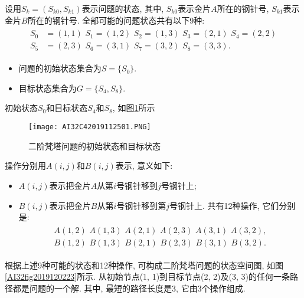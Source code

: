 \begin{result}
设用$S_k=(S_{k0}, S_{k1})$表示问题的状态, 其中, $S_{k0}$表示金片$A$所在的钢针号, $S_{k1}$表示金片$B$所在的钢针号.
全部可能的问题状态共有以下9种:
\begin{align}
\begin{array}{ll}
S_0&=(1, 1)\,\,   S_1=(1, 2)\,\,     S_2=(1, 3)\,\,    S_3=(2, 1)\,\,    S_4=(2, 2)\\
S_5&=(2, 3)\,\,   S_6=(3, 1) \,\,    S_7=(3, 2) \,\,   S_8=(3, 3).
\end{array}
\end{align}

\begin{itemize}
\item 问题的初始状态集合为$S=\{S_0\}$.
\item 目标状态集合为$G=\{S_4, S_8\}$.
\end{itemize}
初始状态$S_0$和目标状态$S_4$和$S_8$, 如图\ref{AI32fig2019120222}所示
\begin{figure}[H]
\centering
\texttt{[image: AI32C42019112501.PNG]}
\caption{二阶梵塔问题的初始状态和目标状态}
\label{AI32fig2019120222}
\end{figure}
操作分别用$A(i, j)$和$B(i, j)$表示, 意义如下:
\begin{itemize}
\item  $A(i, j)$表示把金片$A$从第$i$号钢针移到$j$号钢针上;
\item  $B(i, j)$表示把金片$B$从第$i$号钢针移到第$j$号钢针上. 共有12种操作, 它们分别是:
\begin{align}
\begin{array}{ll}
      A(1, 2)\,\,   A(1, 3) \,\,    A(2, 1)\,\,     A(2, 3) \,\,    A(3, 1) \,\,    A(3, 2),\\
      B(1, 2)\,\,     B(1, 3) \,\,     B(2, 1)\,\,     B(2, 3)  \,\,   B(3, 1)  \,\,    B(3, 2).
\end{array}
\end{align}
\end{itemize}
根据上述9种可能的状态和12种操作, 可构成二阶梵塔问题的状态空间图, 如图\ref{AI32fig2019120223}所示.
从初始节点(1, 1)到目标节点(2, 2)及(3, 3)的任何一条路径都是问题的一个解. 其中, 最短的路径长度是3, 它由3个操作组成.
\end{result}

